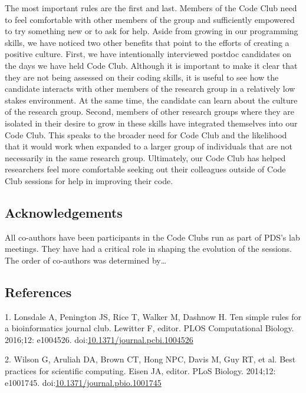 \documentclass[
  11pt,
]{article}
\begin{document}
The most important rules are the first and last. Members of the Code
Club need to feel comfortable with other members of the group and
sufficiently empowered to try something new or to ask for help. Aside
from growing in our programming skills, we have noticed two other
benefits that point to the efforts of creating a positive culture.
First, we have intentionally interviewed postdoc candidates on the days
we have held Code Club. Although it is important to make it clear that
they are not being assessed on their coding skills, it is useful to see
how the candidate interacts with other members of the research group in
a relatively low stakes environment. At the same time, the candidate can
learn about the culture of the research group. Second, members of other
research groups where they are isolated in their desire to grow in these
skills have integrated themselves into our Code Club. This speaks to the
broader need for Code Club and the likelihood that it would work when
expanded to a larger group of individuals that are not necessarily in
the same research group. Ultimately, our Code Club has helped
researchers feel more comfortable seeking out their colleagues outside
of Code Club sessions for help in improving their code.

\hypertarget{acknowledgements}{%
\subsection{Acknowledgements}\label{acknowledgements}}

All co-authors have been participants in the Code Clubs run as part of
PDS's lab meetings. They have had a critical role in shaping the
evolution of the sessions. The order of co-authors was determined
by\ldots{}

\newpage

\hypertarget{references}{%
\subsection{References}\label{references}}

\hypertarget{refs}{}
\leavevmode\hypertarget{ref-Lonsdale2016}{}%
1. Lonsdale A, Penington JS, Rice T, Walker M, Dashnow H. Ten simple
rules for a bioinformatics journal club. Lewitter F, editor. PLOS
Computational Biology. 2016;12: e1004526.
doi:\href{https://doi.org/10.1371/journal.pcbi.1004526}{10.1371/journal.pcbi.1004526}

\leavevmode\hypertarget{ref-Wilson2014}{}%
2. Wilson G, Aruliah DA, Brown CT, Hong NPC, Davis M, Guy RT, et al.
Best practices for scientific computing. Eisen JA, editor. PLoS Biology.
2014;12: e1001745.
doi:\href{https://doi.org/10.1371/journal.pbio.1001745}{10.1371/journal.pbio.1001745}
\end{document}
